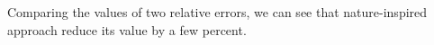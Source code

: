 Comparing the values of two relative errors, we can see that nature-inspired approach reduce its value by a few percent. 
%
%  
%

